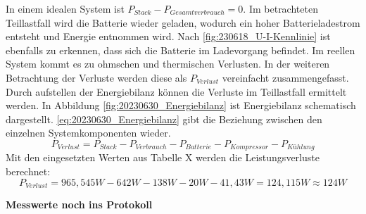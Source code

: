 In einem idealen System ist $P_{Stack}-P_{Gesamtverbrauch}=0$. Im betrachteten Teillastfall wird die Batterie wieder geladen, wodurch ein hoher Batterieladestrom entsteht und Energie entnommen wird.
Nach \autoref{fig:230618_U-I-Kennlinie} ist ebenfalls zu erkennen, dass sich die Batterie im Ladevorgang befindet. 
Im reellen System kommt es zu ohmschen und thermischen Verlusten. In der weiteren Betrachtung der Verluste werden diese als $P_{Verlust}$ vereinfacht zusammengefasst.
Durch aufstellen der Energiebilanz können die Verluste im Teillastfall ermittelt werden.
In Abbildung \autoref{fig:20230630_Energiebilanz} ist Energiebilanz schematisch dargestellt.
\autoref{eq:20230630_Energiebilanz} gibt die Beziehung zwischen den einzelnen Systemkomponenten wieder.
\begin{equation}
  P_{Verlust} = P_{Stack}-P_{Verbrauch}-P_{Batterie}-P_{Kompressor}-P_{Kühlung}
\label{eq:20230630_Energiebilanz}
\end{equation}
Mit den eingesetzten Werten aus Tabelle X werden die Leistungsverluste berechnet:
$$P_{Verlust}=965,545W-642W-138W-20W-41,43W=124,115W \approx 124W$$


\textbf{Messwerte noch ins Protokoll}